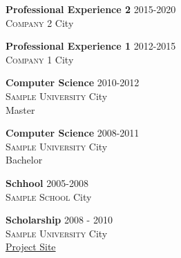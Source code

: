 \begin{body}
    \begin{experience}%
        \begin{cvItem}
            \textbf{Professional Experience 2} \hfill 2015-2020\\
            \textsc{Company 2} City\\
            \lipsum[1]
        \end{cvItem}
        \begin{cvItem}
            \textbf{Professional Experience 1} \hfill 2012-2015\\
            \textsc{Company 1} City\\
            \lipsum[1]
        \end{cvItem}
    \end{experience}

    \begin{education}%
        \begin{cvItem}
            \textbf{Computer Science} \hfill 2010-2012\\
            \textsc{Sample University} City\\
            Master
        \end{cvItem}

        \begin{cvItem}
            \textbf{Computer Science} \hfill 2008-2011\\
            \textsc{Sample University} City\\
            Bachelor
        \end{cvItem}

        \begin{cvItem}
            \textbf{Schhool} \hfill 2005-2008\\
            \textsc{Sample School} City\\
        \end{cvItem}

    \end{education}

    \begin{scholarship}%
        \begin{cvItem}
            \textbf{Scholarship} \hfill 2008 - 2010\\
            \textsc{Sample University} City\\
            \href{https://www.google.de}{Project Site}
        \end{cvItem}
    \end{scholarship}


\end{body}
